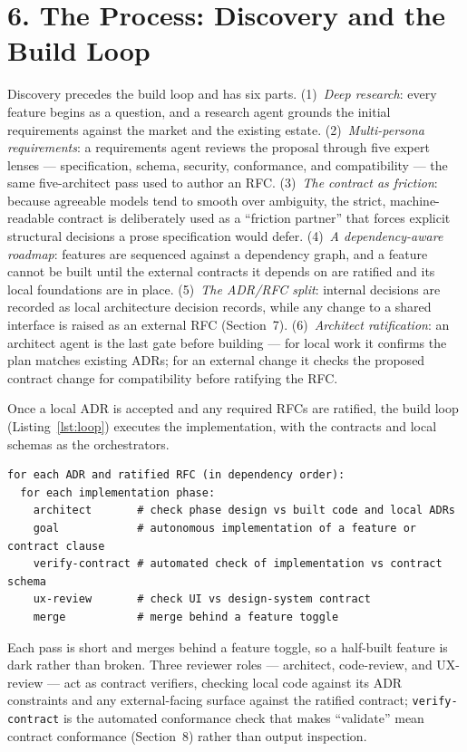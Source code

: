 \documentclass[11pt]{article}
\begin{document}
\section*{6. The Process: Discovery and the Build Loop}
Discovery precedes the build loop and has six parts. (1)~\emph{Deep research}: every feature begins as
a question, and a research agent grounds the initial requirements against the market and the existing
estate. (2)~\emph{Multi-persona requirements}: a requirements agent reviews the proposal through five
expert lenses --- specification, schema, security, conformance, and compatibility --- the same
five-architect pass used to author an RFC. (3)~\emph{The contract as friction}: because agreeable
models tend to smooth over ambiguity, the strict, machine-readable contract is deliberately used as a
``friction partner'' that forces explicit structural decisions a prose specification would defer.
(4)~\emph{A dependency-aware roadmap}: features are sequenced against a dependency graph, and a feature
cannot be built until the external contracts it depends on are ratified and its local foundations are
in place. (5)~\emph{The ADR/RFC split}: internal decisions are recorded as local architecture decision
records, while any change to a shared interface is raised as an external RFC (Section~7).
(6)~\emph{Architect ratification}: an architect agent is the last gate before building --- for local
work it confirms the plan matches existing ADRs; for an external change it checks the proposed contract
change for compatibility before ratifying the RFC.

Once a local ADR is accepted and any required RFCs are ratified, the build loop (Listing~\ref{lst:loop})
executes the implementation, with the contracts and local schemas as the orchestrators.
\begin{lstlisting}[caption={The build loop (per ADR + ratified RFC, in dependency order).},label={lst:loop}]
for each ADR and ratified RFC (in dependency order):
  for each implementation phase:
    architect       # check phase design vs built code and local ADRs
    goal            # autonomous implementation of a feature or contract clause
    verify-contract # automated check of implementation vs contract schema
    ux-review       # check UI vs design-system contract
    merge           # merge behind a feature toggle
\end{lstlisting}
Each pass is short and merges behind a feature toggle, so a half-built feature is dark rather than
broken. Three reviewer roles --- architect, code-review, and UX-review --- act as contract verifiers,
checking local code against its ADR constraints and any external-facing surface against the ratified
contract; \texttt{verify-contract} is the automated conformance check that makes ``validate'' mean
contract conformance (Section~8) rather than output inspection.
\end{document}
